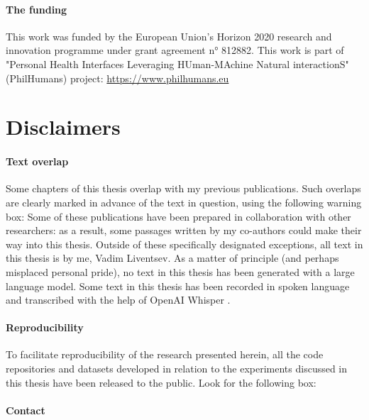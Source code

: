 \paragraph{The funding}

This work was funded by the European Union’s Horizon 2020 research and innovation programme under grant agreement n° 812882. This work is part of "Personal Health Interfaces Leveraging HUman-MAchine Natural interactionS" (PhilHumans) project: \url{https://www.philhumans.eu}

\newpage
\section{Disclaimers}

\paragraph{Text overlap}

Some chapters of this thesis overlap with my previous publications.
Such overlaps are clearly marked in advance of the text in question, using the following warning box:
Some of these publications have been prepared in collaboration with other researchers: as a result, some passages written by my co-authors could make their way into this thesis.
Outside of these specifically designated exceptions, all text in this thesis is by me, Vadim Liventsev.
As a matter of principle (and perhaps misplaced personal pride), no text in this thesis has been generated with a large language model.
Some text in this thesis has been recorded in spoken language and transcribed with the help of OpenAI Whisper \cite{radfordRobustSpeechRecognition2022}.

\paragraph{Reproducibility}

To facilitate reproducibility of the research presented herein, all the code repositories and datasets developed in relation to the experiments discussed in this thesis have been released to the public. Look for the following box:

\paragraph{Contact}

